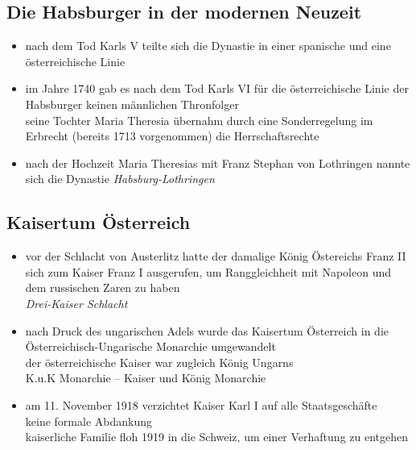 \documentclass[11pt,a4paper]{article}
\begin{document}
\subsection*{\textsf{Die Habsburger in der modernen Neuzeit}}

\begin{itemize}
\item nach dem Tod Karls V teilte sich die Dynastie in einer spanische und eine österreichische Linie

\item im Jahre 1740 gab es nach dem Tod Karls VI für die österreichische Linie der Habsburger keinen männlichen Thronfolger\\
 seine Tochter Maria Theresia übernahm durch eine Sonderregelung im Erbrecht (bereits 1713 vorgenommen) die Herrschaftsrechte

\item nach der Hochzeit Maria Theresias mit Franz Stephan von Lothringen nannte sich die Dynastie \textsl{Habsburg-Lothringen}

\end{itemize}


\subsection*{\textsf{Kaisertum Österreich}}

\begin{itemize}

\item vor der Schlacht von Austerlitz hatte der damalige König Östereichs Franz II sich zum Kaiser Franz I ausgerufen, um Ranggleichheit mit Napoleon und dem russischen Zaren zu haben\\
 \textsl{Drei-Kaiser Schlacht}

\item nach Druck des ungarischen Adels wurde das Kaisertum Österreich in die Österreichisch-Ungarische Monarchie umgewandelt\\
 der österreichische Kaiser war zugleich König Ungarns\\
 K.u.K Monarchie -- Kaiser und König Monarchie

\item am 11. November 1918 verzichtet Kaiser Karl I auf alle Staatsgeschäfte\\
 keine formale Abdankung\\
 kaiserliche Familie floh 1919 in die Schweiz, um einer Verhaftung zu entgehen


\end{itemize}
\end{document}
